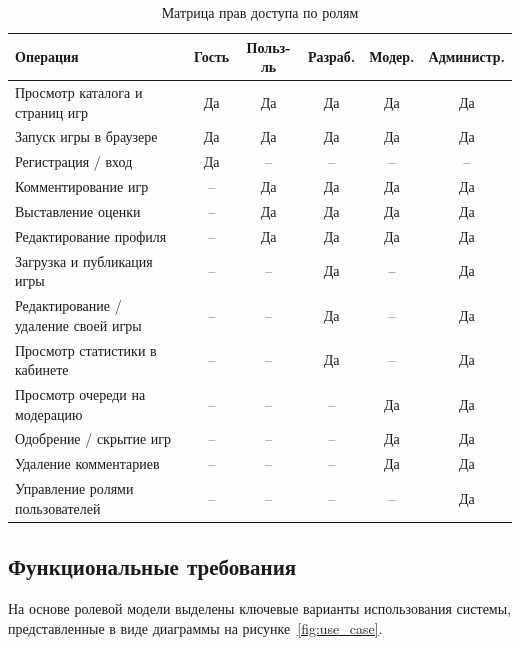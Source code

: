 \begin{table}[ht!]
    \centering
    \caption{Матрица прав доступа по ролям}
    \label{tab:roles}
    \small
    \begin{tabularx}{\textwidth}{|X|c|c|c|c|c|}
        \hline
        \textbf{Операция} &
        \textbf{Гость} &
        \textbf{Польз-ль} &
        \textbf{Разраб.} &
        \textbf{Модер.} &
        \textbf{Администр.} \\ \hline
        Просмотр каталога и страниц игр     & Да & Да & Да & Да & Да \\ \hline
        Запуск игры в браузере              & Да & Да & Да & Да & Да \\ \hline
        Регистрация / вход                  & Да & --  & --  & --  & -- \\ \hline
        Комментирование игр                 & --  & Да & Да & Да & Да \\ \hline
        Выставление оценки                  & --  & Да & Да & Да & Да \\ \hline
        Редактирование профиля              & --  & Да & Да & Да & Да \\ \hline
        Загрузка и публикация игры          & --  & --  & Да & --  & Да \\ \hline
        Редактирование / удаление своей игры& --  & --  & Да & --  & Да \\ \hline
        Просмотр статистики в кабинете      & --  & --  & Да & --  & Да \\ \hline
        Просмотр очереди на модерацию       & --  & --  & --  & Да & Да \\ \hline
        Одобрение / скрытие игр             & --  & --  & --  & Да & Да \\ \hline
        Удаление комментариев               & --  & --  & --  & Да & Да \\ \hline
        Управление ролями пользователей     & --  & --  & --  & --  & Да \\ \hline
    \end{tabularx}
\end{table}

\subsection{Функциональные требования}

На основе ролевой модели выделены ключевые варианты использования системы,
представленные в виде диаграммы на рисунке~\ref{fig:use_case}.

